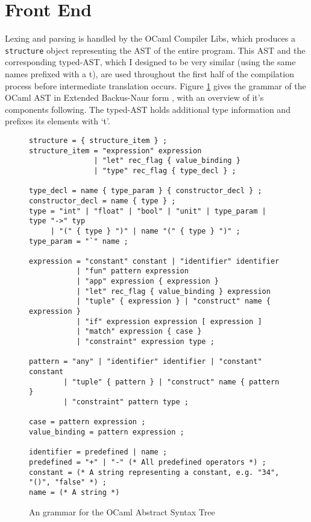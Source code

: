 \documentclass[12pt,twoside,notitlepage]{report}
\newcommand{\textinline}{\texttt}
\newcommand{\cfbox}[2]{%
	\colorlet{currentcolor}{.}%
	{\color{#1}%
		\fbox{\color{currentcolor}#2}}%
}
\newcommand\note[1]{\noindent\cfbox{blue}{\parbox{\textwidth}{\textcolor{blue}{#1}}}}
\begin{document}

\note{I have a large number of pending comments on this chapter from Tobias, so I expect it's going to have significant rewrites. I've been focusing on the Evaluation and Conclusion recently.}

\section{Front End}
Lexing and parsing is handled by the OCaml Compiler Libs, which produces a \textinline{structure} object representing the AST of the entire program. This AST and the corresponding typed-AST, which I designed to be very similar (using the same names prefixed with a t), are used throughout the first half of the compilation process before intermediate translation occurs. Figure \ref{fig:ast} gives the grammar of the OCaml AST in Extended Backus-Naur form \cite{Ebnf}, with an overview of it's components following. The typed-AST holds additional type information and prefixes its elements with `t'.
\begin{figure}[h!]
	\begin{verbatim}
structure = { structure_item } ;
structure_item = "expression" expression
               | "let" rec_flag { value_binding }
               | "type" rec_flag { type_decl } ;

type_decl = name { type_param } { constructor_decl } ;
constructor_decl = name { type } ;
type = "int" | "float" | "bool" | "unit" | type_param | type "->" typ
     | "(" { type } ")" | name "(" { type } ")" ;
type_param = "`" name ;

expression = "constant" constant | "identifier" identifier
           | "fun" pattern expression
           | "app" expression { expression }
           | "let" rec_flag { value_binding } expression
           | "tuple" { expression } | "construct" name { expression }
           | "if" expression expression [ expression ]
           | "match" expression { case }
           | "constraint" expression type ;
           
pattern = "any" | "identifier" identifier | "constant" constant
        | "tuple" { pattern } | "construct" name { pattern }
        | "constraint" pattern type ;
        
case = pattern expression ;
value_binding = pattern expression ;
           
identifier = predefined | name ;
predefined = "+" | "-" (* All predefined operators *) ;
constant = (* A string representing a constant, e.g. "34", "()", "false" *) ;
name = (* A string *)
	\end{verbatim}
	\caption{An grammar for the OCaml Abstract Syntax Tree}
	\label{fig:ast}
\end{figure}
\end{document}
